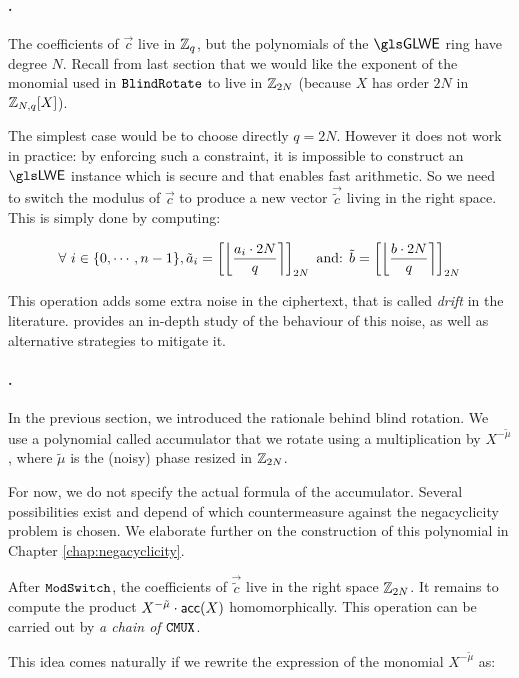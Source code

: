 \paragraph{\ModSwitch.} The coefficients of $\vec c$ live in $\mathbb{Z}_q$, but the polynomials of the $\GLWE$ ring have degree $N$. Recall from last section that we would like the exponent of the monomial used in $\texttt{BlindRotate}$ to live in $\mathbb{Z}_{2N}$ (because $X$ has order $2N$ in $\mathbb{Z}_{N,q}[X]$).

The simplest case would be to choose directly $q = 2N$. However it does not work in practice: by enforcing such a constraint, it is impossible to construct an $\LWE$ instance which is secure and that enables fast arithmetic. So we need to switch the modulus of $\vec c$ to produce a new vector $\vec{\tilde c}$ living in the right space. This is simply done by computing:

\[
	\forall~i \in \{0, \cdots, n-1\}, \tilde a_i = \left [ \left \lfloor \frac{a_i \cdot 2N}{q} \right \rceil \right ]_{2N} \text{ and: } \tilde b = \left [ \left \lfloor \frac{b \cdot 2N}{q} \right \rceil \right ]_{2N}
\]


This operation adds some extra noise in the ciphertext, that is called \textit{drift} in the literature. \cite{EC:BJSW25} provides an in-depth study of the behaviour of this noise, as well as alternative strategies to mitigate it.


\paragraph{\BlindRotate.}

In the previous section, we introduced the rationale behind blind rotation. We use a polynomial called accumulator that we rotate using a multiplication by $X^{-\tilde \mu}$, where $\tilde \mu$ is the (noisy) phase resized in $\mathbb{Z}_{2N}$.

For now, we do not specify the actual formula of the accumulator. Several possibilities exist and depend of which countermeasure against the negacyclicity problem is chosen. We elaborate further on the construction of this polynomial in Chapter \ref{chap:negacyclicity}.


After $\texttt{ModSwitch}$, the coefficients of $\vec{\tilde{c}}$ live in the right space $\mathbb{Z}_{2N}$. It remains to compute the product $X^{-\tilde \mu} \cdot \textsf{acc}(X)$ homomorphically. This operation can be carried out by \textit{a chain of $\texttt{CMUX}$}.


This idea comes naturally if we rewrite the expression of the monomial $X^{-\tilde \mu}$ as:

